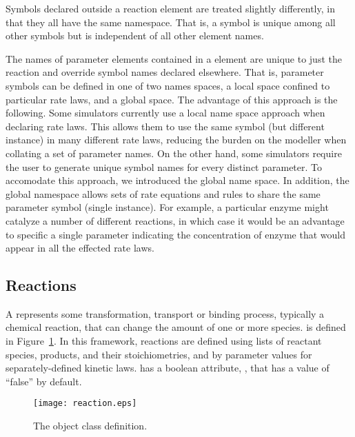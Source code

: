 \documentclass[10pt]{cek-article}
\begin{document}
Symbols declared outside a reaction element are treated slightly
differently, in that they all have the same namespace.  That is, a
symbol is unique among all other symbols but is independent of
all other element names.

The names of parameter elements contained in a  element are
unique to just the reaction and override symbol names declared elsewhere.
That is, parameter symbols can be defined in one of two names spaces, a
local space confined to particular rate laws, and a global space.  The
advantage of this approach is the following.  Some simulators currently use
a local name space approach when declaring rate laws.  This allows them to
use the same symbol (but different instance) in many different rate laws,
reducing the burden on the modeller when collating a set of parameter
names.  On the other hand, some simulators require the user to generate
unique symbol names for every distinct parameter.  To accomodate this
approach, we introduced the global name space.  In addition, the global
namespace allows sets of rate equations and rules to share the same
parameter symbol (single instance).  For example, a particular enzyme might
catalyze a number of different reactions, in which case it would be an
advantage to specific a single parameter indicating the concentration of
enzyme that would appear in all the effected rate laws.

\subsection{Reactions}

A  represents some transformation, transport or binding
process, typically a chemical reaction, that can change the amount of one
or more species.   is defined in Figure~\ref{fig:reaction}.
In this framework, reactions are defined using lists of reactant species,
products, and their stoichiometries, and by parameter values for
separately-defined kinetic laws.   has a boolean attribute,
, that has a value of ``false'' by default.

\begin{figure}[htb]
  \centering
  \texttt{[image: reaction.eps]}
  \caption{The  object class definition.}
  \label{fig:reaction}
\end{figure}
\end{document}
